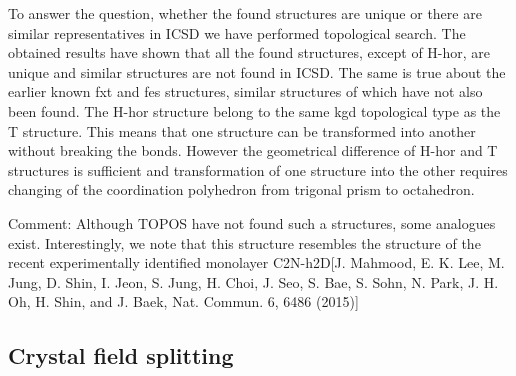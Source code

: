 \documentclass[a4paperm]{article}
\begin{document}
To answer the question, whether the found structures are unique or there are similar representatives in ICSD we have performed topological search.
The obtained results have shown that all the found structures, except of H-hor, are unique and similar structures are not found in ICSD.
The same is true about the earlier known fxt and fes structures, similar structures of which have not also been found. 
The H-hor structure belong to the same kgd topological type as the T structure.
This means that one structure can be transformed into another without breaking the bonds.
However the geometrical difference of H-hor and T structures is sufficient and transformation of one structure into the other requires changing of the coordination polyhedron from trigonal prism to octahedron.

Comment:
Although TOPOS have not found such a structures, some analogues exist.
Interestingly, we note that this structure resembles the structure of the recent experimentally identified monolayer C2N-h2D[J. Mahmood, E. K. Lee, M. Jung, D. Shin, I. Jeon, S. Jung, H. Choi, J. Seo, S. Bae, S. Sohn, N. Park, J. H. Oh, H. Shin, and J.
Baek, Nat. Commun. 6, 6486 (2015)]





\subsection{Crystal field splitting}
\end{document}
